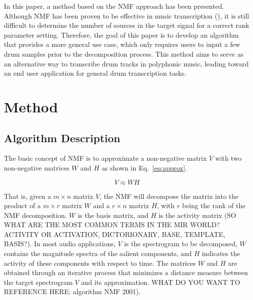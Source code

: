 \documentclass{article}
\begin{document}
In this paper, a method based on the NMF approach has been presented. Although NMF has been proven to be effective in music transcription (\cite{2003 Smaragdis, NMF}), it is still difficult to determine the number of sources in the target signal for a correct rank parameter setting. Therefore, the goal of this paper is to develop an algorithm that provides a more general use case, which only requires users to input a few drum samples prior to the decomposition process. This method aims to serve as an alternative way to transcribe drum tracks in polyphonic music, leading toward an end user application for general drum transcription tasks.  
 
\section{Method}\label{sec:method}
\subsection{Algorithm Description}\label{subsec:algorithm description}
The basic concept of NMF is to approximate a non-negative matrix $V$ with two non-negative matrices $W$ and $H$ as shown in Eq.~\eqref{eq:approx}.

\begin{equation}
V \approx WH
\label{eq:approx}
\end{equation}

That is, given a $m \times n$ matrix $V$, the NMF will decompose the matrix into the product of a $m \times r$ matrix $W$ and a $r \times n$ matrix $H$, with $r$ being the rank of the NMF decomposition. $W$ is the basis matrix, and $H$ is the activity matrix (SO WHAT ARE THE MOST COMMON TERMS IN THE MIR WORLD? ACTIVITY OR ACTIVATION, DICTORIONARY, BASE, TEMPLATE, BASIS?). In most audio applications, $V$ is the spectrogram to be decomposed, $W$ contains the magnitude spectra of the salient components, and $H$ indicates the activity of these components with respect to time. The matrices $W$ and $H$ are obtained through an iterative process that minimizes a distance measure between the target spectrogram $V$ and its approximation. WHAT DO YOU WANT TO REFERENCE HERE: \cite{} algorithm NMF 2001). 
\end{document}
